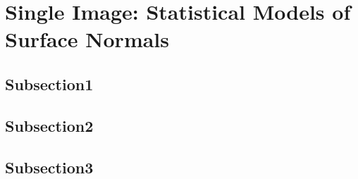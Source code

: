 \chapter{Single Image: Statistical Models of Surface Normals}\label{ch:singl_imag}
\minitoc{}
\section{Subsection1}
\lipsum[1]
\section{Subsection2}
\lipsum[1]
\section{Subsection3}
\lipsum[1]
\stopcontents[chapters]

